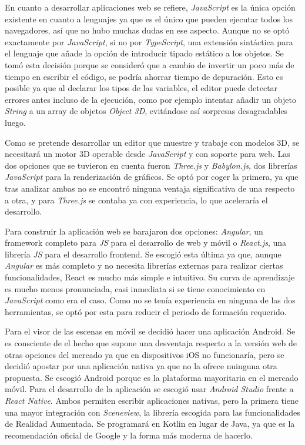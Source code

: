 En cuanto a desarrollar aplicaciones web se refiere, \textit{JavaScript} es la única opción existente en cuanto a lenguajes ya que es el único que pueden ejecutar todos los navegadores, así que no hubo muchas dudas en ese aspecto. Aunque no se optó exactamente por \textit{JavaScript}, si no por \textit{TypeScript}, una extensión sintáctica para el lenguaje que añade la opción de introducir tipado estático a los objetos. Se tomó esta decisión porque se consideró que a cambio de invertir un poco más de tiempo en escribir el código, se podría ahorrar tiempo de depuración. Esto es posible ya que al declarar los tipos de las variables, el editor puede detectar errores antes incluso de la ejecución, como por ejemplo intentar añadir un objeto \textit{String} a un array de objetos \textit{Object 3D}, evitándose así sorpresas desagradables luego.

Como se pretende desarrollar un editor que muestre y trabaje con modelos 3D, se necesitará un motor 3D operable desde \textit{JavaScript} y con soporte para web. Las dos opciones que se tuvieron en cuenta fueron \textit{Three.js}\cite{three} y \textit{Babylon.js}\cite{babylon}, dos librerías \textit{JavaScript} para la renderización de gráficos. Se optó por coger la primera, ya que tras analizar ambas no se encontró ninguna ventaja significativa de una respecto a otra, y para \textit{Three.js} se contaba ya con experiencia, lo que aceleraría el desarrollo.

Para construir la aplicación web se barajaron dos opciones: \textit{Angular}\cite{angular}, un framework completo para \textit{JS} para el desarrollo de web y móvil o \textit{React.js}\cite{react}, una librería \textit{JS} para el desarrollo frontend. Se escogió esta última ya que, aunque \textit{Angular} es más completo y no necesita librerías externas para realizar ciertas funcionalidades, React es mucho más simple e intuitivo. Su curva de aprendizaje es mucho menos pronunciada, casi inmediata si se tiene conocimiento en \textit{JavaScript} como era el caso. Como no se tenía experiencia en ninguna de las dos herramientas, se optó por esta para reducir el periodo de formación requerido.

Para el visor de las escenas en móvil se decidió hacer una aplicación Android. Se es consciente de el hecho que supone una desventaja respecto a la versión web de otras opciones del mercado ya que en dispositivos iOS no funcionaría, pero se decidió apostar por una aplicación nativa ya que no la ofrece nuinguna otra propuesta. Se escogió Android porque es la plataforma mayoritaria en el mercado móvil. Para el desarrollo de la aplicación se escogió usar \textit{Android Studio} frente a \textit{React Native}. Ambos permiten escribir aplicaciones nativas, pero la primera tiene una mayor integración con \textit{Sceneview}, la librería escogida para las funcionalidades de Realidad Aumentada. Se programará en Kotlin en lugar de Java, ya que es la recomendación oficial de Google y la forma más moderna de hacerlo.

